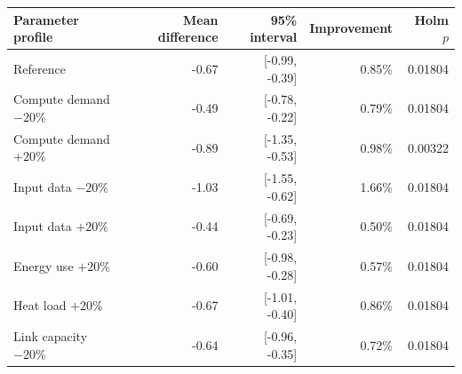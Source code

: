 \begin{tabular}{lrrrr}
\toprule
Parameter profile & Mean difference & 95\% interval & Improvement & Holm $p$ \\
\midrule
Reference & -0.67 & [-0.99, -0.39] & 0.85\% & 0.01804 \\
Compute demand $-20\%$ & -0.49 & [-0.78, -0.22] & 0.79\% & 0.01804 \\
Compute demand $+20\%$ & -0.89 & [-1.35, -0.53] & 0.98\% & 0.00322 \\
Input data $-20\%$ & -1.03 & [-1.55, -0.62] & 1.66\% & 0.01804 \\
Input data $+20\%$ & -0.44 & [-0.69, -0.23] & 0.50\% & 0.01804 \\
Energy use $+20\%$ & -0.60 & [-0.98, -0.28] & 0.57\% & 0.01804 \\
Heat load $+20\%$ & -0.67 & [-1.01, -0.40] & 0.86\% & 0.01804 \\
Link capacity $-20\%$ & -0.64 & [-0.96, -0.35] & 0.72\% & 0.01804 \\
\bottomrule
\end{tabular}